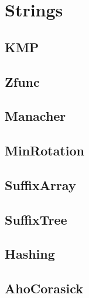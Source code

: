 \chapter{Strings}

\section{KMP}
\section{Zfunc}
\section{Manacher}
\section{MinRotation}
\section{SuffixArray}
\section{SuffixTree}
\section{Hashing}
\section{AhoCorasick}
